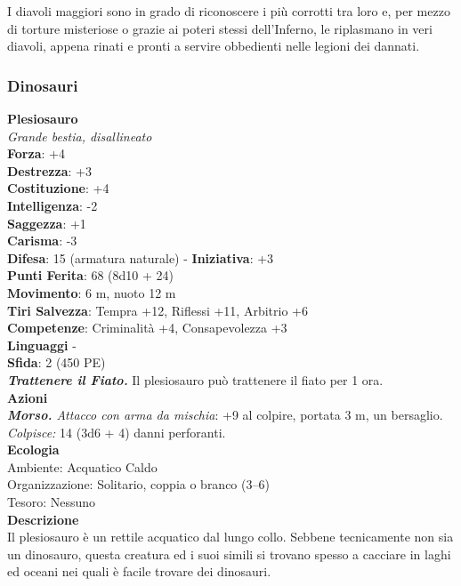 \begin{multicols}{2}
I diavoli maggiori sono in grado di riconoscere i più corrotti tra loro e, per mezzo di torture misteriose o grazie ai poteri stessi dell'Inferno, le riplasmano in veri diavoli, appena rinati e pronti a servire obbedienti nelle legioni dei dannati.\\

\subsubsection{Dinosauri}

\medskip\textbf{Plesiosauro}\\
\emph{Grande bestia, disallineato}\\
\textbf{Forza}: +4\\
\textbf{Destrezza}: +3\\
\textbf{Costituzione}: +4\\
\textbf{Intelligenza}: -2\\
\textbf{Saggezza}: +1\\
\textbf{Carisma}: -3\\
\textbf{Difesa}: 15 (armatura naturale) - \textbf{Iniziativa}: +3\\
\textbf{Punti Ferita}: 68 (8d10 + 24)\\
\textbf{Movimento}: 6 m, nuoto 12 m\\
\textbf{Tiri Salvezza}: Tempra +12, Riflessi +11, Arbitrio +6\\
\textbf{Competenze}: Criminalità +4, Consapevolezza +3\\
\textbf{Linguaggi} -\\
\textbf{Sfida}: 2 (450 PE)\smallskip\\
\emph{\textbf{Trattenere il Fiato.}} Il plesiosauro può trattenere il fiato per 1 ora.\\
\smallskip\textbf{Azioni}\\
\emph{\textbf{Morso.} Attacco con arma da mischia}: +9 al colpire, portata 3 m, un bersaglio.\\
\emph{Colpisce:} 14 (3d6 + 4) danni perforanti. \\
\textbf{Ecologia}\\
Ambiente: Acquatico Caldo\\
Organizzazione: Solitario, coppia o branco (3–6)\\
Tesoro: Nessuno\\
\textbf{Descrizione}\\
Il plesiosauro è un rettile acquatico dal lungo collo. Sebbene tecnicamente non sia un dinosauro, questa creatura ed i suoi simili si trovano spesso a cacciare in laghi ed oceani nei quali è facile trovare dei dinosauri.\\


\end{multicols}
